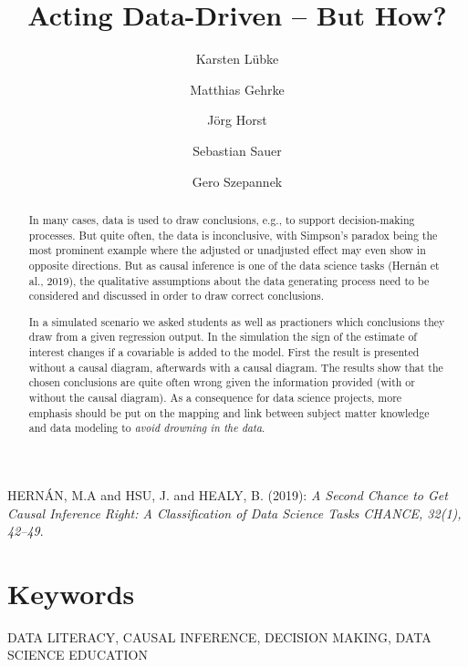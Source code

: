 \documentclass{svmult}
\begin{document}
\title*{Acting Data-Driven -- But How?}

\author{Karsten L\"{u}bke\and
Matthias Gehrke\and
J\"{o}rg Horst\and
Sebastian Sauer \and
Gero Szepannek}

\maketitle

\begin{abstract}
In many cases, data is used to draw conclusions, e.g., to support decision-making processes.
But quite often, the data is inconclusive, with Simpson's paradox being the most prominent example where the adjusted or unadjusted effect may even show in opposite directions.
But as causal inference is one of the data science tasks (Hern\'{a}n et al., 2019), the qualitative assumptions about the data generating process need to be considered and discussed in order to draw correct conclusions.

In a simulated scenario we asked students as well as practioners which conclusions they draw from a given regression output. In the simulation the sign of the estimate of interest changes if a covariable is added to the model.
First the result is presented without a causal diagram, afterwards with a causal diagram. 
The results show that the chosen conclusions are quite often wrong given the information provided (with or without the causal diagram). 
As a consequence for data science projects, more emphasis should be put on the mapping and link between subject matter knowledge and data modeling to {\em avoid drowning in the data}.


\end{abstract}

\begin{thebibliography}{1}

\item[]
HERN\'{A}N, M.A and HSU, J. and  HEALY, B. (2019): {\em A Second Chance to Get
Causal Inference Right: A Classification of Data Science Tasks CHANCE, 32(1), 42--49}. 

\end{thebibliography}

\section*{Keywords}
DATA LITERACY, CAUSAL INFERENCE, DECISION MAKING, DATA SCIENCE EDUCATION 
\end{document}
